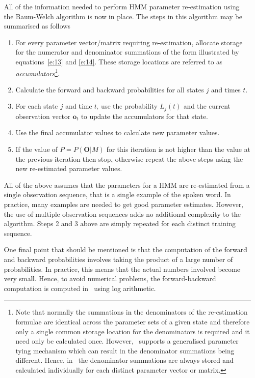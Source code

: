All of the information needed to perform HMM
parameter re-estimation using the Baum-Welch algorithm
is now in place.
The steps in this algorithm may be summarised as follows
\begin{enumerate}
\item For every parameter vector/matrix requiring 
      re-estimation, allocate storage for the numerator
      and denominator summations of the form illustrated
      by equations~\ref{e:13} and \ref{e:14}.  These
      storage locations are referred to as
      {\it accumulators}\footnote{
      Note that normally the summations in
      the denominators of the re-estimation formulae are identical
      across the parameter sets of a given state and therefore
      only a single common storage location for the denominators
      is required and it need only be calculated once. However,
      \HTK\ supports a generalised parameter tying mechanism
      which can result in the denominator summations being
      different.  Hence, in \HTK\, the denominator summations
      are always stored and calculated individually 
      for each distinct parameter vector or matrix.}.
\item Calculate the forward and backward probabilities
      for all states $j$ and times $t$.
\item For each state $j$ and time $t$, use the probability
      $L_j(t)$ and the current observation vector $\bm{o}_t$
      to update the accumulators for that state.
\item Use the final accumulator values to calculate new
      parameter values.
\item If the value of $P=P(\bm{O}|M)$ for this iteration is not
      higher than the value at the previous
      iteration then stop, otherwise repeat the above steps
      using the new re-estimated parameter values.
\end{enumerate}

All of the above assumes that the parameters for a HMM are
re-estimated from a single observation sequence, that is a
single example of the spoken word.  In practice, many
examples are needed to get good parameter estimates.  However,
the use of multiple observation sequences adds no additional complexity
to the algorithm. Steps 2 and 3 above are simply repeated for
each distinct training sequence.

One final point that should be mentioned is that the computation
of the forward and backward probabilities involves taking the
product of a large number of probabilities.  In practice, this
means that the actual numbers involved become very small.  Hence,
to avoid numerical problems, the forward-backward computation
is computed in \HTK\ using log arithmetic.

